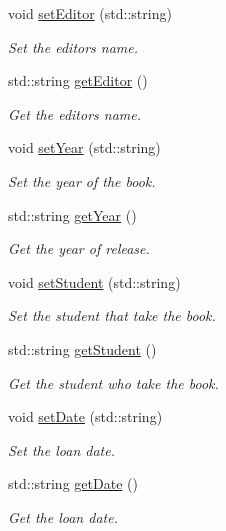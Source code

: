\begin{DoxyCompactItemize}
void \hyperlink{classBook_a463af516921d49d46b730c455b2de0c3}{set\+Editor} (std\+::string)
\begin{DoxyCompactList}\small\item\em Set the editor\textquotesingle{}s name. \end{DoxyCompactList}\item 
std\+::string \hyperlink{classBook_a8df0e201c23d298f20bc4f36f74ac728}{get\+Editor} ()
\begin{DoxyCompactList}\small\item\em Get the editor\textquotesingle{}s name. \end{DoxyCompactList}\item 
void \hyperlink{classBook_a3383a947b8522adc83e16afecba914be}{set\+Year} (std\+::string)
\begin{DoxyCompactList}\small\item\em Set the year of the book. \end{DoxyCompactList}\item 
std\+::string \hyperlink{classBook_a933b321fec5c6c8bbe39e9d2c0b3de2d}{get\+Year} ()
\begin{DoxyCompactList}\small\item\em Get the year of release. \end{DoxyCompactList}\item 
void \hyperlink{classBook_a92bee3d10d8372e002684c018462dc4c}{set\+Student} (std\+::string)
\begin{DoxyCompactList}\small\item\em Set the student that take the book. \end{DoxyCompactList}\item 
std\+::string \hyperlink{classBook_ae5e61d969f34faf755921a397bdfaf20}{get\+Student} ()
\begin{DoxyCompactList}\small\item\em Get the student who take the book. \end{DoxyCompactList}\item 
void \hyperlink{classBook_a8e0cf166c4e0b5f412d0b472f83e6972}{set\+Date} (std\+::string)
\begin{DoxyCompactList}\small\item\em Set the loan date. \end{DoxyCompactList}\item 
std\+::string \hyperlink{classBook_a23a3ee3588cc83853c02182afbb5842e}{get\+Date} ()
\begin{DoxyCompactList}\small\item\em Get the loan date. \end{DoxyCompactList}\end{DoxyCompactItemize}
